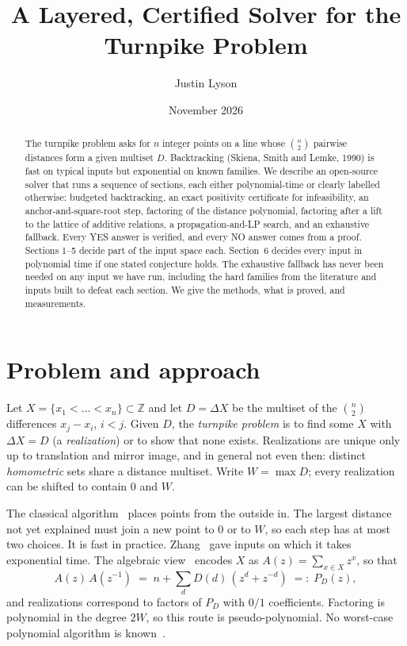 \documentclass[11pt]{article}
\title{A Layered, Certified Solver for the Turnpike Problem}
\author{Justin Lyson}
\date{November 2026}
\theoremstyle{definition}
\newcommand{\Z}{\mathbb{Z}}
\begin{document}
\maketitle

\begin{abstract}
The turnpike problem asks for $n$ integer points on a line whose $\binom{n}{2}$ pairwise distances form a given
multiset $D$. Backtracking (Skiena, Smith and Lemke, 1990) is fast on typical inputs but exponential on known
families. We describe an open-source solver that runs a sequence of sections, each either polynomial-time or clearly
labelled otherwise: budgeted backtracking, an exact positivity certificate for infeasibility, an anchor-and-square-root
step, factoring of the distance polynomial, factoring after a lift to the lattice of additive relations, a
propagation-and-LP search, and an exhaustive fallback. Every YES answer is verified, and every NO answer comes
from a proof. Sections 1--5 decide part of the input space each. Section~6 decides every input in polynomial time if
one stated conjecture holds. The exhaustive fallback has never been needed on any input we have run, including the
hard families from the literature and inputs built to defeat each section. We give the methods, what is proved,
and measurements.
\end{abstract}

\section{Problem and approach}

Let $X=\{x_1<\dots<x_n\}\subset\Z$ and let $D=\Delta X$ be the multiset of the $\binom n2$ differences $x_j-x_i$,
$i<j$. Given $D$, the \emph{turnpike problem} is to find some $X$ with $\Delta X = D$ (a \emph{realization}) or to
show that none exists. Realizations are unique only up to translation and mirror image, and in general not even then:
distinct \emph{homometric} sets share a distance multiset. Write $W=\max D$; every realization can be shifted
to contain $0$ and $W$.

The classical algorithm~\cite{SSL90} places points from the outside in. The largest distance not yet explained must
join a new point to $0$ or to $W$, so each step has at most two choices. It is fast in practice. Zhang~\cite{Zhang94}
gave inputs on which it takes exponential time. The algebraic view~\cite{RS82,SSL90} encodes $X$ as
$A(z)=\sum_{x\in X}z^x$, so that
\begin{equation}\label{eq:P}
  A(z)\,A(z^{-1}) \;=\; n+\sum_{d} D(d)\,(z^d+z^{-d}) \;=:\; P_D(z),
\end{equation}
and realizations correspond to factors of $P_D$ with $0/1$ coefficients. Factoring is polynomial in the degree $2W$,
so this route is pseudo-polynomial. No worst-case polynomial algorithm is known~\cite{LSS03,Dakic00}.
\end{document}
